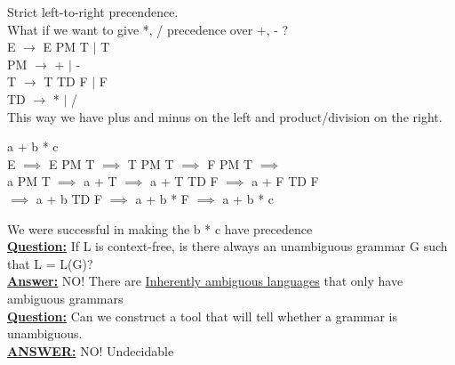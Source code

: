\documentclass[12pt]{article}
\newcommand{\myt}[1]{\textbf{\underline{#1}}}
\begin{document}
	 Strict left-to-right precendence.\\
	 
	 What if we want to give *, / precedence over +, - ?\\
	 E $\rightarrow$ E PM T $|$ T\\
	 PM $\rightarrow$ + $|$ -\\
	 T $\rightarrow$ T TD F $|$ F \\
	 TD $\rightarrow$ * $|$ /\\
	 This way we have plus and minus on the left and product/division on the right.
	 
	 a + b * c\\
	 E $\implies$ E PM T $\implies$ T PM T $\implies$ F PM T $\implies$\\
	 a PM T $\implies$ a + T $\implies$ a + T TD F $\implies$ a + F TD F\\
	 $\implies$ a + b TD F $\implies$ a + b * F $\implies$ a + b * c\\
	 
	 \begin{center}\end{center}
	 
	 We were successful in making the b * c have precedence\\
	 
	 \myt{Question:} If L is context-free, is there always an unambiguous grammar G such that L = L(G)?\\
	 
	 \myt{Answer:} NO! There are \underline{Inherently ambiguous languages} that only have ambiguous grammars\\
	 
	 \myt{Question:} Can we construct a tool that will tell whether a grammar is unambiguous.\\
	 
	 \myt{ANSWER:} NO! Undecidable\\
	 
\end{document}
